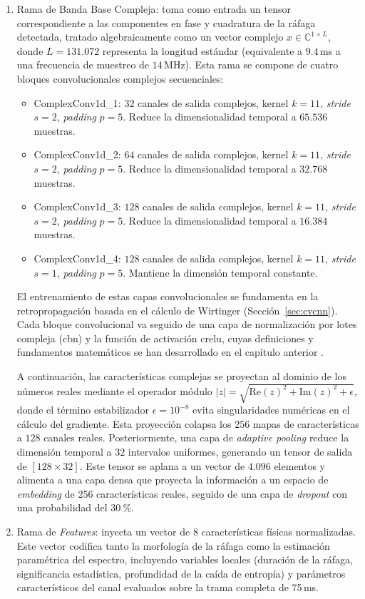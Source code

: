 \begin{enumerate}
    \item Rama de Banda Base Compleja:
    toma como entrada un tensor correspondiente a las componentes en fase y cuadratura de la ráfaga detectada, tratado algebraicamente como un vector complejo $x \in \mathbb{C}^{1 \times L}$, donde $L = 131.072$ representa la longitud estándar (equivalente a $9.4$\,ms a una frecuencia de muestreo de $14$\,MHz). Esta rama se compone de cuatro bloques convolucionales complejos secuenciales:
    \begin{itemize}
        \item ComplexConv1d\_1: $32$ canales de salida complejos, kernel $k=11$, \textit{stride} $s=2$, \textit{padding} $p=5$. Reduce la dimensionalidad temporal a $65.536$ muestras.
        \item ComplexConv1d\_2: $64$ canales de salida complejos, kernel $k=11$, \textit{stride} $s=2$, \textit{padding} $p=5$. Reduce la dimensionalidad temporal a $32.768$ muestras.
        \item ComplexConv1d\_3: $128$ canales de salida complejos, kernel $k=11$, \textit{stride} $s=2$, \textit{padding} $p=5$. Reduce la dimensionalidad temporal a $16.384$ muestras.
        \item ComplexConv1d\_4: $128$ canales de salida complejos, kernel $k=11$, \textit{stride} $s=1$, \textit{padding} $p=5$. Mantiene la dimensión temporal constante.
    \end{itemize}

    El entrenamiento de estas capas convolucionales se fundamenta en la retropropagación basada en el cálculo de Wirtinger (Sección~\ref{sec:cvcnn}). Cada bloque convolucional va seguido de una capa de normalización por lotes compleja (\gls{cbn}) y la función de activación \gls{crelu}, cuyas definiciones y fundamentos matemáticos se han desarrollado en el capítulo anterior \cite{trabelsi_deep_2018}.
    
    A continuación, las características complejas se proyectan al dominio de los números reales mediante el operador módulo $|z| = \sqrt{\text{Re}(z)^2 + \text{Im}(z)^2 + \epsilon}$, donde el término estabilizador $\epsilon = 10^{-8}$ evita singularidades numéricas en el cálculo del gradiente. Esta proyección colapsa los $256$ mapas de características a $128$ canales reales. Posteriormente, una capa de \textit{adaptive pooling} reduce la dimensión temporal a $32$ intervalos uniformes, generando un tensor de salida de $[128 \times 32]$. Este tensor se aplana a un vector de $4.096$ elementos y alimenta a una capa densa que proyecta la información a un espacio de \textit{embedding} de $256$ características reales, seguido de una capa de \textit{dropout} con una probabilidad del $30~\%$.
    
    \item Rama de \textit{Features}:
    inyecta un vector de $8$ características físicas normalizadas. Este vector codifica tanto la morfología de la ráfaga como la estimación paramétrica del espectro, incluyendo variables locales (duración de la ráfaga, significancia estadística, profundidad de la caída de entropía) y parámetros característicos del canal evaluados sobre la trama completa de 75\,ms.
\end{enumerate}
